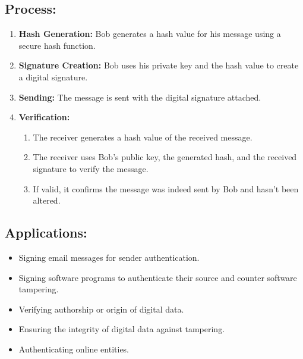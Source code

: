 \subsection{Process:}
\begin{enumerate}
    \item \textbf{Hash Generation:} Bob generates a hash value for his message using a secure hash function.
    \item \textbf{Signature Creation:} Bob uses his private key and the hash value to create a digital signature.
    \item \textbf{Sending:} The message is sent with the digital signature attached.
    \item \textbf{Verification:} \begin{enumerate}
    \item The receiver generates a hash value of the received message.
    \item The receiver uses Bob’s public key, the generated hash, and the received signature to verify the message.
    \item If valid, it confirms the message was indeed sent by Bob and hasn’t been altered.
\end{enumerate}
\end{enumerate}


\subsection{Applications:}
\begin{itemize}
    \item Signing email messages for sender authentication.
    \item Signing software programs to authenticate their source and counter software tampering.
    \item Verifying authorship or origin of digital data.
    \item Ensuring the integrity of digital data against tampering.
    \item Authenticating online entities.
\end{itemize}

